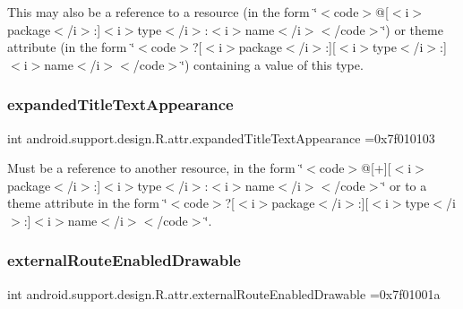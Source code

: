 This may also be a reference to a resource (in the form \char`\"{}$<$code$>$@\mbox{[}$<$i$>$package$<$/i$>$\+:\mbox{]}$<$i$>$type$<$/i$>$\+:$<$i$>$name$<$/i$>$$<$/code$>$\char`\"{}) or theme attribute (in the form \char`\"{}$<$code$>$?\mbox{[}$<$i$>$package$<$/i$>$\+:\mbox{]}\mbox{[}$<$i$>$type$<$/i$>$\+:\mbox{]}$<$i$>$name$<$/i$>$$<$/code$>$\char`\"{}) containing a value of this type. \mbox{\label{classandroid_1_1support_1_1design_1_1R_1_1attr_a76fae0174c646f6356295d5fa987cf07}} 
\subsubsection{\texorpdfstring{expanded\+Title\+Text\+Appearance}{expandedTitleTextAppearance}}
{\footnotesize\ttfamily int android.\+support.\+design.\+R.\+attr.\+expanded\+Title\+Text\+Appearance =0x7f010103\hspace{0.3cm}{\ttfamily [static]}}

Must be a reference to another resource, in the form \char`\"{}$<$code$>$@\mbox{[}+\mbox{]}\mbox{[}$<$i$>$package$<$/i$>$\+:\mbox{]}$<$i$>$type$<$/i$>$\+:$<$i$>$name$<$/i$>$$<$/code$>$\char`\"{} or to a theme attribute in the form \char`\"{}$<$code$>$?\mbox{[}$<$i$>$package$<$/i$>$\+:\mbox{]}\mbox{[}$<$i$>$type$<$/i$>$\+:\mbox{]}$<$i$>$name$<$/i$>$$<$/code$>$\char`\"{}. \mbox{\label{classandroid_1_1support_1_1design_1_1R_1_1attr_ab10411e3c39861612dd04971d76f133f}} 
\subsubsection{\texorpdfstring{external\+Route\+Enabled\+Drawable}{externalRouteEnabledDrawable}}
{\footnotesize\ttfamily int android.\+support.\+design.\+R.\+attr.\+external\+Route\+Enabled\+Drawable =0x7f01001a\hspace{0.3cm}{\ttfamily [static]}}

